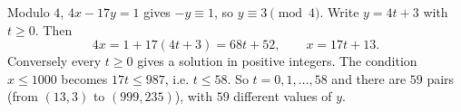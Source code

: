 Modulo $4$, $4x-17y=1$ gives $-y\equiv1$, so $y\equiv3\pmod4$. Write $y=4t+3$ with $t\ge0$. Then
\[4x=1+17(4t+3)=68t+52,\qquad x=17t+13.\]
Conversely every $t\ge0$ gives a solution in positive integers. The condition $x\le1000$ becomes $17t\le987$, i.e. $t\le58$. So $t=0,1,\dots,58$ and there are $\boxed{59}$ pairs (from $(13,3)$ to $(999,235)$), with $59$ different values of $y$.
